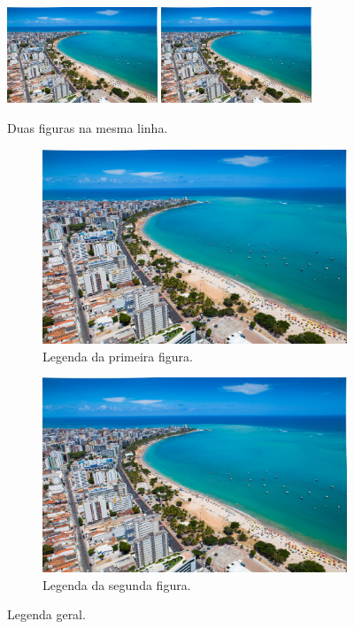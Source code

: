 \documentclass{abntex2}
\begin{document}
\begin{figure}[h]
	\centering
	\includegraphics[width=0.4\textwidth]{maceio.jpg}
	\includegraphics[width=0.4\textwidth]{maceio.jpg}
	\caption{Duas figuras na mesma linha.}
\end{figure}

\begin{figure}
	\begin{subfigure}{0.5\textwidth}
		\includegraphics[width=\textwidth]{maceio.jpg}
		\caption{Legenda da primeira figura.}
		\label{subfigure1}
	\end{subfigure}
	\begin{subfigure}{0.5\textwidth}
		\includegraphics[width=\textwidth]{maceio.jpg}
		\caption{Legenda da segunda figura.}
		\label{subfigure2}
	\end{subfigure}
	\caption{Legenda geral.}
\end{figure}
\end{document}

